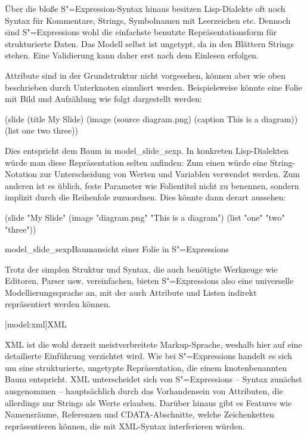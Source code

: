 \documentclass[12pt, a4paper, bibgerm]{scrbook}
\newenvironment{DIFnomarkup}{}{}
\newcommand\lsection{}
\newcommand\abb{}
\newcommand\fig{}
\newcommand{\sexp}{S"=Expression}
\newcommand{\sexps}{S"=Expressions}
\begin{document}
Über die bloße \sexp{}-Syntax hinaus besitzen Lisp-Dialekte oft noch
Syntax für Kommentare, Strings, Symbolnamen mit Leerzeichen
etc. Dennoch sind \sexps{} wohl die einfachste benutzte
Repräsentationsform für strukturierte Daten. Das Modell selbst ist
ungetypt, da in den Blättern Strings stehen. Eine Validierung kann
daher erst nach dem Einlesen erfolgen.

Attribute sind in der Grundstruktur nicht vorgesehen, können aber wie
oben beschrieben durch Unterknoten simuliert werden. Beispielsweise
könnte eine Folie mit Bild und Aufzählung wie folgt dargestellt werden:
\begin{DIFnomarkup}\begin{code}
(slide 
  (title My Slide)
  (image
    (source diagram.png)
    (caption This is a diagram))
  (list one two three))
\end{code}\end{DIFnomarkup}
Dies entspricht dem Baum in \abb{model_slide_sexp}. In konkreten
Lisp-Dialekten würde man diese Repräsentation selten anfinden: Zum einen
würde eine String-Notation zur Unterscheidung von Werten und Variablen
verwendet werden. Zum anderen ist es üblich, feste Parameter wie
Folientitel nicht zu benennen, sondern implizit durch die Reihenfole
zuzuordnen. Dies könnte dann derart aussehen:
\begin{DIFnomarkup}\begin{code}
(slide "My Slide"
  (image "diagram.png" "This is a diagram")
  (list "one" "two" "three"))
\end{code}\end{DIFnomarkup}

\fig{model_slide_sexp}{Baumansicht einer Folie in \sexps{}}

Trotz der simplen Struktur und Syntax, die auch benötigte Werkzeuge wie
Editoren, Parser usw. vereinfachen, bieten \sexps{} also eine
universelle Modellierungssprache an, mit der auch Attribute und Listen
indirekt repräsentiert werden können.

\lsection[model:xml]{XML}

XML ist die wohl derzeit meistverbreitete Markup-Sprache, weshalb hier
auf eine detailierte Einführung verzichtet wird. Wie bei \sexps{}
handelt es sich um eine strukturierte, ungetypte Repräsentation, die
einem knotenbenannten Baum entspricht. XML unterscheidet sich von
\sexps{} -- Syntax zunächst ausgenommen -- hauptsächlich durch das
Vorhandensein von Attributen, die allerdings nur Strings als Werte
erlauben. Darüber hinaus gibt es Features wie Namensräume, Referenzen
und CDATA-Abschnitte, welche Zeichenketten repräsentieren können, die
mit XML-Syntax interferieren würden.
\end{document}
